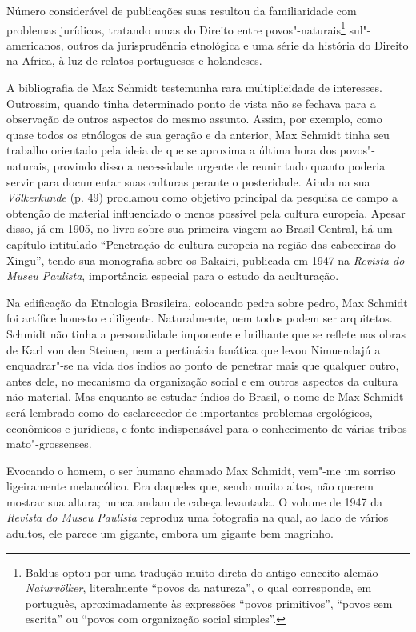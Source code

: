 Número considerável de publicações suas resultou da familiaridade com
problemas jurídicos, tratando umas do Direito entre
povos"-naturais\footnote{Baldus optou por uma tradução muito direta do
  antigo conceito alemão \emph{Naturvölker}, literalmente ``povos da
  natureza'', o qual corresponde, em português, aproximadamente às
  expressões ``povos primitivos'', ``povos sem escrita'' ou ``povos com
  organização social simples''.} sul"-americanos, outros da jurisprudência
etnológica e uma série da história do Direito na Africa, à luz de
relatos portugueses e holandeses.

A bibliografia de Max Schmidt testemunha rara multiplicidade de
interesses. Outrossim, quando tinha determinado ponto de vista não se
fechava para a observação de outros aspectos do mesmo assunto. Assim,
por exemplo, como quase todos os etnólogos de sua geração e da anterior,
Max Schmidt tinha seu trabalho orientado pela ideia de que se aproxima a
última hora dos povos"-naturais, provindo disso a necessidade urgente de
reunir tudo quanto poderia servir para documentar suas culturas perante
o posteridade. Ainda na sua \emph{Völkerkunde} (p. 49) proclamou como
objetivo principal da pesquisa de campo a obtenção de material
influenciado o menos possível pela cultura europeia. Apesar disso, já em
1905, no livro sobre sua primeira viagem ao Brasil Central, há um
capítulo intitulado ``Penetração de cultura europeia na região das
cabeceiras do Xingu'', tendo sua monografia sobre os Bakairi, publicada
em 1947 na \emph{Revista do Museu Paulista}, importância especial para o
estudo da aculturação.

Na edificação da Etnologia Brasileira, colocando pedra sobre pedro, Max
Schmidt foi artífice honesto e diligente. Naturalmente, nem todos podem
ser arquitetos. Schmidt não tinha a personalidade imponente e brilhante
que se reflete nas obras de Karl von den Steinen, nem a pertinácia
fanática que levou Nimuendajú a enquadrar"-se na vida dos índios ao ponto
de penetrar mais que qualquer outro, antes dele, no mecanismo da
organização social e em outros aspectos da cultura não material. Mas
enquanto se estudar índios do Brasil, o nome de Max Schmidt será
lembrado como do esclarecedor de importantes problemas ergológicos,
econômicos e jurídicos, e fonte indispensável para o conhecimento de
várias tribos mato"-grossenses.


Evocando o homem, o ser humano chamado Max Schmidt, vem"-me um sorriso
ligeiramente melancólico. Era daqueles que, sendo muito altos, não
querem mostrar sua altura; nunca andam de cabeça levantada. O volume de
1947 da \emph{Revista do Museu Paulista} reproduz uma fotografia na
qual, ao lado de vários adultos, ele parece um gigante, embora um
gigante bem magrinho.

